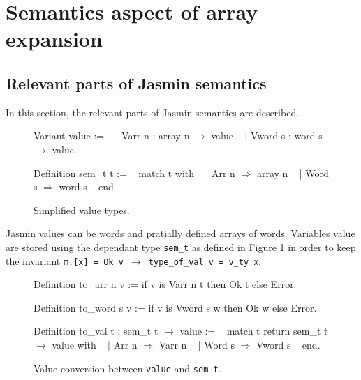 \documentclass{article}
\begin{document}
\section{Semantics aspect of array expansion}\label{sec:semantics}

\subsection{Relevant parts of Jasmin semantics}

In this section, the relevant parts of Jasmin semantics are described.

\begin{figure}
\obeylines\obeyspaces\ttfamily%
Variant value :=
~ | Varr  n : array n \(\rightarrow\) value
~ | Vword s : word  s \(\rightarrow\) value.

Definition sem\_t t :=
~ match t with
~ | Arr  n \(\Rightarrow\) array n
~ | Word s \(\Rightarrow\) word  s
~ end.
\normalfont%
\caption{Simplified value types.}\label{fig:val}
\end{figure}

Jasmin values can be words and pratially defined arrays of words. Variables value
are stored using the dependant type \texttt{sem\_t} as defined in Figure
\ref{fig:val} in order to keep the invariant
\texttt{m.[x] = Ok v \(\rightarrow\) type\_of\_val v = v\_ty x}.

\begin{figure}
\obeylines\obeyspaces\ttfamily%
Definition to\_arr  n v := if v is Varr  n t then Ok t else Error.

Definition to\_word s v := if v is Vword s w then Ok w else Error.

Definition to\_val t : sem\_t t \(\rightarrow\) value :=
~ match t return sem\_t t \(\rightarrow\) value with
~ | Arr  n \(\Rightarrow\) Varr  n
~ | Word s \(\Rightarrow\) Vword s
~ end.
\normalfont%
\caption{Value conversion between \texttt{value} and \texttt{sem\_t}.}
\end{figure}
\end{document}
